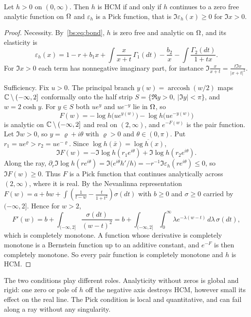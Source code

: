\begin{theorem}\label{bs:thm:crit}
Let $h>0$ on $(0,\infty)$. Then $h$ is HCM if and only if $h$ continues to a zero free analytic function on $\Omega$ and $\varepsilon_h$ is a Pick function, that is $\Im\varepsilon_h(x)\ge0$ for $\Im x>0$.
\end{theorem}

\begin{proof}
Necessity. By~\eqref{bs:eq:bond}, $h$ is zero free and analytic on $\Omega$, and its elasticity is
\[
\varepsilon_h(x)=1-r+b_1x+\int\frac{x}{x+t}\,\Gamma_1(dt)-\frac{b_2}{x}-\int\frac{\Gamma_2(dt)}{1+tx}.
\]
For $\Im x>0$ each term has nonnegative imaginary part, for instance $\Im\frac{x}{x+t}=\frac{t\Im x}{|x+t|^2}$.

Sufficiency. Fix $u>0$. The principal branch $y(w)=\operatorname{arccosh}(w/2)$ maps $\mathbb{C}\setminus(-\infty,2]$ conformally onto the half strip $S=\{\Re y>0,\ |\Im y|<\pi\}$, and $w=2\cosh y$. For $y\in S$ both $ue^{y}$ and $ue^{-y}$ lie in $\Omega$, so
\[
F(w)=-\log h\bigl(ue^{y(w)}\bigr)-\log h\bigl(ue^{-y(w)}\bigr)
\]
is analytic on $\mathbb{C}\setminus(-\infty,2]$ and real on $(2,\infty)$, and $e^{-F(w)}$ is the pair function. Let $\Im w>0$, so $y=\varrho+i\theta$ with $\varrho>0$ and $\theta\in(0,\pi)$. Put $r_1=ue^{\varrho}>r_2=ue^{-\varrho}$. Since $\log h(\bar x)=\overline{\log h(x)}$,
\[
\Im F(w)=-\Im\log h(r_1e^{i\theta})+\Im\log h(r_2e^{i\theta}).
\]
Along the ray, $\partial_r\Im\log h(re^{i\theta})=\Im\bigl(e^{i\theta}h'/h\bigr)=-r^{-1}\Im\varepsilon_h(re^{i\theta})\le0$, so $\Im F(w)\ge0$. Thus $F$ is a Pick function that continues analytically across $(2,\infty)$, where it is real. By the Nevanlinna representation $F(w)=a+bw+\int(\frac1{t-w}-\frac t{1+t^2})\sigma(dt)$ with $b\ge0$ and $\sigma\ge0$ carried by $(-\infty,2]$. Hence for $w>2$,
\[
F'(w)=b+\int_{(-\infty,2]}\frac{\sigma(dt)}{(w-t)^2}=b+\int_{(-\infty,2]}\int_0^\infty\lambda e^{-\lambda(w-t)}\,d\lambda\,\sigma(dt),
\]
which is completely monotone. A function whose derivative is completely monotone is a Bernstein function up to an additive constant, and $e^{-F}$ is then completely monotone. So every pair function is completely monotone and $h$ is HCM.
\end{proof}

The two conditions play different roles. Analyticity without zeros is global and rigid: one zero or pole of $h$ off the negative axis destroys HCM, however small its effect on the real line. The Pick condition is local and quantitative, and can fail along a ray without any singularity.

